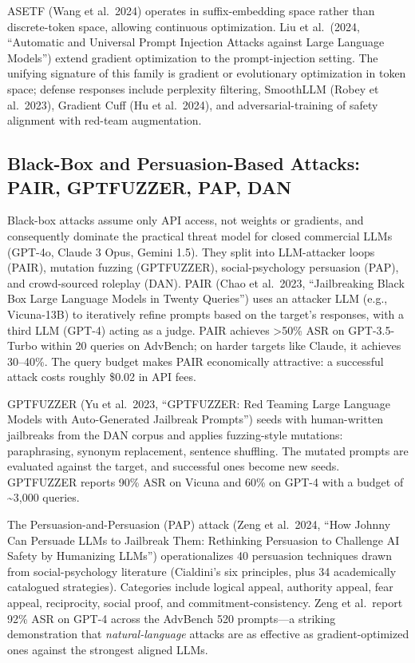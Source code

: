\documentclass{article}
\begin{document}
ASETF (Wang et al.~2024) operates in suffix-embedding space rather than discrete-token space, allowing continuous optimization. Liu et al.~(2024, ``Automatic and Universal Prompt Injection Attacks against Large Language Models'') extend gradient optimization to the prompt-injection setting. The unifying signature of this family is gradient or evolutionary optimization in token space; defense responses include perplexity filtering, SmoothLLM (Robey et al.~2023), Gradient Cuff (Hu et al.~2024), and adversarial-training of safety alignment with red-team augmentation.

\subsection{Black-Box and Persuasion-Based Attacks: PAIR, GPTFUZZER, PAP, DAN}\label{black-box-and-persuasion-based-attacks-pair-gptfuzzer-pap-dan}

Black-box attacks assume only API access, not weights or gradients, and consequently dominate the practical threat model for closed commercial LLMs (GPT-4o, Claude 3 Opus, Gemini 1.5). They split into LLM-attacker loops (PAIR), mutation fuzzing (GPTFUZZER), social-psychology persuasion (PAP), and crowd-sourced roleplay (DAN). PAIR (Chao et al.~2023, ``Jailbreaking Black Box Large Language Models in Twenty Queries'') uses an attacker LLM (e.g., Vicuna-13B) to iteratively refine prompts based on the target's responses, with a third LLM (GPT-4) acting as a judge. PAIR achieves \textgreater50\% ASR on GPT-3.5-Turbo within 20 queries on AdvBench; on harder targets like Claude, it achieves 30--40\%. The query budget makes PAIR economically attractive: a successful attack costs roughly \$0.02 in API fees.

GPTFUZZER (Yu et al.~2023, ``GPTFUZZER: Red Teaming Large Language Models with Auto-Generated Jailbreak Prompts'') seeds with human-written jailbreaks from the DAN corpus and applies fuzzing-style mutations: paraphrasing, synonym replacement, sentence shuffling. The mutated prompts are evaluated against the target, and successful ones become new seeds. GPTFUZZER reports 90\% ASR on Vicuna and 60\% on GPT-4 with a budget of \textasciitilde3,000 queries.

The Persuasion-and-Persuasion (PAP) attack (Zeng et al.~2024, ``How Johnny Can Persuade LLMs to Jailbreak Them: Rethinking Persuasion to Challenge AI Safety by Humanizing LLMs'') operationalizes 40 persuasion techniques drawn from social-psychology literature (Cialdini's six principles, plus 34 academically catalogued strategies). Categories include logical appeal, authority appeal, fear appeal, reciprocity, social proof, and commitment-consistency. Zeng et al.~report 92\% ASR on GPT-4 across the AdvBench 520 prompts---a striking demonstration that \emph{natural-language} attacks are as effective as gradient-optimized ones against the strongest aligned LLMs.
\end{document}
